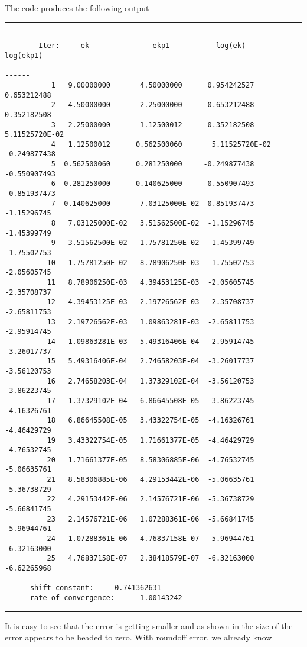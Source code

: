 \documentclass[10pt,fleqn]{article}
\begin{document}
The code produces the following output
\vskip0.1in\hrule\vskip0.1in
\noindent
\begin{verbatim}

        Iter:     ek               ekp1           log(ek)          log(ekp1)
        --------------------------------------------------------------------
           1   9.00000000       4.50000000      0.954242527      0.653212488
           2   4.50000000       2.25000000      0.653212488      0.352182508
           3   2.25000000       1.12500012      0.352182508       5.11525720E-02
           4   1.12500012      0.562500060       5.11525720E-02 -0.249877438
           5  0.562500060      0.281250000     -0.249877438     -0.550907493
           6  0.281250000      0.140625000     -0.550907493     -0.851937473
           7  0.140625000       7.03125000E-02 -0.851937473      -1.15296745
           8   7.03125000E-02   3.51562500E-02  -1.15296745      -1.45399749
           9   3.51562500E-02   1.75781250E-02  -1.45399749      -1.75502753
          10   1.75781250E-02   8.78906250E-03  -1.75502753      -2.05605745
          11   8.78906250E-03   4.39453125E-03  -2.05605745      -2.35708737
          12   4.39453125E-03   2.19726562E-03  -2.35708737      -2.65811753
          13   2.19726562E-03   1.09863281E-03  -2.65811753      -2.95914745
          14   1.09863281E-03   5.49316406E-04  -2.95914745      -3.26017737
          15   5.49316406E-04   2.74658203E-04  -3.26017737      -3.56120753
          16   2.74658203E-04   1.37329102E-04  -3.56120753      -3.86223745
          17   1.37329102E-04   6.86645508E-05  -3.86223745      -4.16326761
          18   6.86645508E-05   3.43322754E-05  -4.16326761      -4.46429729
          19   3.43322754E-05   1.71661377E-05  -4.46429729      -4.76532745
          20   1.71661377E-05   8.58306885E-06  -4.76532745      -5.06635761
          21   8.58306885E-06   4.29153442E-06  -5.06635761      -5.36738729
          22   4.29153442E-06   2.14576721E-06  -5.36738729      -5.66841745
          23   2.14576721E-06   1.07288361E-06  -5.66841745      -5.96944761
          24   1.07288361E-06   4.76837158E-07  -5.96944761      -6.32163000
          25   4.76837158E-07   2.38418579E-07  -6.32163000      -6.62265968

      shift constant:     0.741362631
      rate of convergence:      1.00143242

\end{verbatim}
\vskip0.1in\hrule\vskip0.1in
\noindent
It is easy to see that the error is getting smaller and as shown in the size of
the error appears to be headed to zero. With roundoff error, we already know
\end{document}
